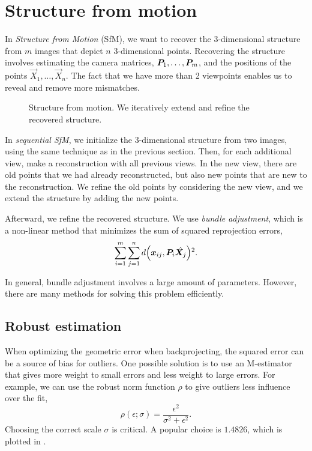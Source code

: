 \section{Structure from motion} \label{sec:sfm}

In \textit{Structure from Motion} (SfM), we want to recover the 3-dimensional
structure from $m$ images that depict $n$ 3-dimensional points. Recovering the
structure involves estimating the camera matrices, $\bm{P}_1, \ldots,
\bm{P}_m$, and the positions of the points $\vec{X}_1, \ldots, \vec{X}_n$. The
fact that we have more than 2 viewpoints enables us to reveal and remove more
mismatches.

\begin{figure}[b]
    \centering
    \caption{Structure from motion. We iteratively extend and refine the
    recovered structure.}
    \label{fig:structure-from-motion}
\end{figure}

In \textit{sequential SfM}, we initialize the 3-dimensional structure from
two images, using the same technique as in the previous section. Then, for each
additional view, make a reconstruction with all previous views. In the new
view, there are old points that we had already reconstructed, but also new
points that are new to the reconstruction. We refine the old points by
considering the new view, and we extend the structure by adding the new points.

Afterward, we refine the recovered structure. We use \textit{bundle
adjustment}, which is a non-linear method that minimizes the sum of squared
reprojection errors, \[
  \sum_{i=1}^m \sum_{j=1}^n d \lft( \vec{x}_{ij}, \mat{P}_i \hat{\mat{X}_j} \rgt)^2
.\]

In general, bundle adjustment involves a large amount of parameters. However,
there are many methods for solving this problem efficiently.

\subsection{Robust estimation}

When optimizing the geometric error when backprojecting, the squared error can
be a source of bias for outliers. One possible solution is to use an
M-estimator that gives more weight to small errors and less weight to large
errors. For example, we can use the robust norm function $\rho$ to give
outliers less influence over the fit, \[
  \rho(\epsilon; \sigma) = \frac{\epsilon^2}{\sigma^2 + \epsilon^2}
.\]
Choosing the correct scale $\sigma$ is critical. A popular choice is $1.4826$,
which is plotted in .

